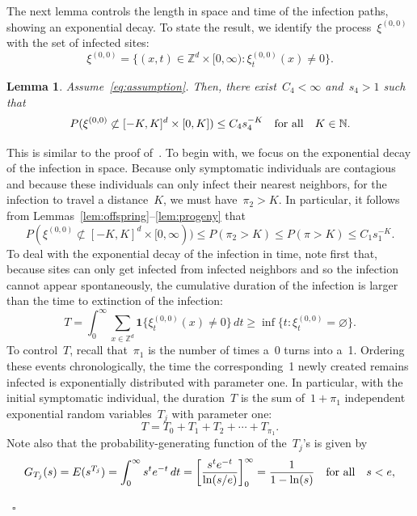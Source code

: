 \documentclass[letterpaper,11pt,twoside,keywordsasfootnote,addressatend,noinfoline]{article}
\newtheorem{lemma}[theorem]{Lemma}
\newenvironment{proof}{\noindent{\bf Proof.}}{\hspace*{2mm}~$\square$}
\newcommand{\N}{\mathbb{N}}
\newcommand{\Z}{\mathbb{Z}}
\newcommand{\ind}{\mathbf{1}}
\begin{document}
 The next lemma controls the length in space and time of the infection paths, showing an exponential decay.
 To state the result, we identify the process~$\xi^{(0, 0)}$ with the set of infected sites:
 $$ \xi^{(0, 0)} = \{(x, t) \in \Z^d \times [0, \infty) : \xi_t^{(0, 0)} (x) \neq 0 \}. $$
\begin{lemma}
\label{lem:decay}
 Assume~\eqref{eq:assumption}.
 Then, there exist~$C_4 < \infty$ and~$s_4 > 1$ such that
 $$ P (\xi^{(0, 0)} \not \subset [-K, K]^d \times [0, K]) \leq C_4 s_4^{-K} \quad \hbox{for all} \quad K \in \N. $$
\end{lemma}
\begin{proof}
 This is similar to the proof of~\cite[Lemma~11]{lanchier_mercer_yun}.
 To begin with, we focus on the exponential decay of the infection in space.
 Because only symptomatic individuals are contagious and because these individuals can only infect their nearest neighbors, for the infection to travel a distance~$K$, we must have~$\pi_2 > K$.
 In particular, it follows from Lemmas~\ref{lem:offspring}--\ref{lem:progeny} that
\begin{equation}
\label{eq:decay-1}
  P (\xi^{(0, 0)} \not \subset [-K, K]^d \times [0, \infty)) \leq P (\pi_2 > K) \leq P (\pi > K) \leq C_1 s_1^{-K}.
\end{equation}
 To deal with the exponential decay of the infection in time, note first that, because sites can only get infected from infected neighbors and so the infection cannot appear spontaneously, the cumulative duration of the infection is larger than the time to extinction of the infection:
\begin{equation}
\label{eq:decay-2}
  T = \int_0^{\infty} \sum_{x \in \Z^d} \ind \{\xi_t^{(0, 0)} (x) \neq 0 \} \,dt \geq \inf \{t : \xi_t^{(0, 0)} = \varnothing \}.
\end{equation}
 To control~$T$, recall that~$\pi_1$ is the number of times a~0 turns into a~1.
 Ordering these events chronologically, the time the corresponding~1 newly created remains infected is exponentially distributed with parameter one.
 In particular, with the initial symptomatic individual, the duration~$T$ is the sum of~$1 + \pi_1$ independent exponential random variables~$T_j$ with parameter one:
\begin{equation}
\label{eq:decay-3}
  T = T_0 + T_1 + T_2 + \cdots + T_{\pi_1}.
\end{equation}
 Note also that the probability-generating function of the~$T_j$'s is given by
 $$ G_{T_j} (s) = E (s^{T_j}) = \int_0^{\infty} s^t e^{-t} \,dt = \bigg[\frac{s^t e^{-t}}{\ln (s/e)} \bigg]_0^{\infty} = \frac{1}{1 - \ln (s)} \quad \hbox{for all} \quad s < e, $$

\end{proof}
\end{document}
